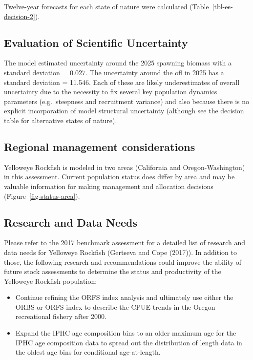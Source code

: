 \documentclass[
]{scrartcl}
\providecommand{\tightlist}{%
  \setlength{\itemsep}{0pt}\setlength{\parskip}{0pt}}\usepackage{longtable,booktabs,array}
\begin{document}
Twelve-year forecasts for each state of nature were calculated
(Table~\ref{tbl-es-decision-2}).

\subsection{Evaluation of Scientific
Uncertainty}\label{evaluation-of-scientific-uncertainty}

The model estimated uncertainty around the 2025 spawning biomass with a
standard deviation = 0.027. The uncertainty around the \gls{ofl} in 2025
has a standard deviation = 11.546. Each of these are likely
underestimates of overall uncertainty due to the necessity to fix
several key population dynamics parameters (e.g.~steepness and
recruitment variance) and also because there is no explicit
incorporation of model structural uncertainty (although see the decision
table for alternative states of nature).

\subsection{Regional management
considerations}\label{regional-management-considerations}

Yelloweye Rockfish is modeled in two areas (California and
Oregon-Washington) in this assessment. Current population status does
differ by area and may be valuable information for making management and
allocation decisions (Figure~\ref{fig-status-area}).

\subsection{Research and Data Needs}\label{research-and-data-needs-1}

Please refer to the 2017 benchmark assessment for a detailed list of
research and data needs for Yelloweye Rockfish (Gertseva and Cope
(2017)). In addition to those, the following research and
recommendations could improve the ability of future stock assessments to
determine the status and productivity of the Yelloweye Rockfish
population:

\begin{itemize}
\tightlist
\item
  Continue refining the ORFS index analysis and ultimately use either
  the ORBS or ORFS index to describe the CPUE trends in the Oregon
  recreational fishery after 2000.
\item
  Expand the IPHC age composition bins to an older maximum age for the
  IPHC age composition data to spread out the distribution of length
  data in the oldest age bins for conditional age-at-length.
\end{itemize}
\end{document}
